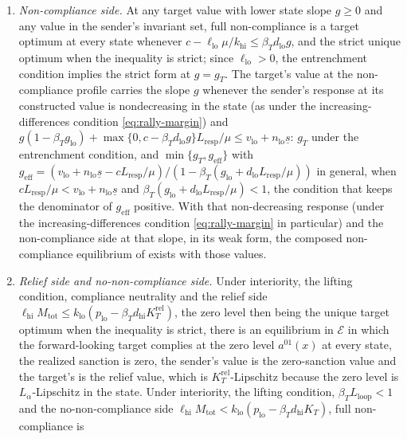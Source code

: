 \begin{proposition}
\label{prop:bracket}
\begin{enumerate}[label=(\roman*)]
\item \emph{Non-compliance side.} At any target value with lower state slope $g\ge0$
and any value in the sender's invariant set, full non-compliance is a target optimum at every
state whenever $c-\ell_{\mathrm{lo}}\mu/k_{\mathrm{hi}}\le\beta_Td_{\mathrm{lo}}g$,
and the strict unique optimum when the inequality is strict; since
$\ell_{\mathrm{lo}}>0$, the entrenchment condition implies the strict form at
$g=g_T$. The target's value at the
non-compliance profile carries the slope $g$ whenever the sender's response at its
constructed value is nondecreasing in the state (as under the increasing-differences condition \eqref{eq:rally-margin}) and
$g(1-\beta_Tg_{\mathrm{lo}})+\max\{0,c-\beta_Td_{\mathrm{lo}}g\}L_{\mathrm{resp}}/\mu\le v_{\mathrm{lo}}+n_{\mathrm{lo}}\underline s$:
$g_T$ under the entrenchment condition, and $\min\{g_T,g_{\mathrm{eff}}\}$ with
$g_{\mathrm{eff}}=(v_{\mathrm{lo}}+n_{\mathrm{lo}}\underline s-cL_{\mathrm{resp}}/\mu)/(1-\beta_T(g_{\mathrm{lo}}+d_{\mathrm{lo}}L_{\mathrm{resp}}/\mu))$
in general, when $cL_{\mathrm{resp}}/\mu<v_{\mathrm{lo}}+n_{\mathrm{lo}}\underline s$ and
$\beta_T(g_{\mathrm{lo}}+d_{\mathrm{lo}}L_{\mathrm{resp}}/\mu)<1$, the condition
that keeps the denominator of $g_{\mathrm{eff}}$ positive.
With that non-decreasing response (under the increasing-differences condition
\eqref{eq:rally-margin} in particular) and the non-compliance side at that
slope, in its weak form, the composed non-compliance equilibrium of
 exists with those values.
\item \emph{Relief side and no-non-compliance side.} Under interiority, the lifting condition,
compliance neutrality and the relief side
$\ell_{\mathrm{hi}}M_{\mathrm{tot}}\le k_{\mathrm{lo}}(p_{\mathrm{lo}}-\beta_Td_{\mathrm{hi}}K_T^{\mathrm{rel}})$,
the zero level then being the unique target optimum when the inequality is
strict, there is
an equilibrium in $\mathcal E$ in which the forward-looking target complies at the
zero level $a^{01}(x)$ at every state, the realized sanction is zero, the
sender's value is the zero-sanction value and the target's is the relief
value, which is $K_T^{\mathrm{rel}}$-Lipschitz because the zero level is
$L_\alpha$-Lipschitz in the state. Under interiority, the lifting condition,
$\beta_TL_{\mathrm{loop}}<1$ and the no-non-compliance side
$\ell_{\mathrm{hi}}M_{\mathrm{tot}}<k_{\mathrm{lo}}(p_{\mathrm{lo}}-\beta_Td_{\mathrm{hi}}K_T)$, full non-compliance is

\end{enumerate}
\end{proposition}
